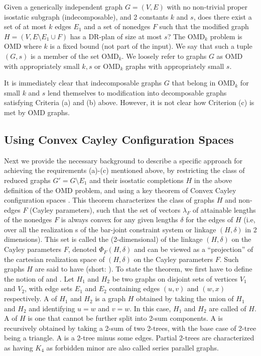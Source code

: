 Given a generically independent graph $G = (V,E)$ with no non-trivial
proper isostatic subgraph (indecomposable), and 2 constants $k$ and
$s$, does there exist a set of at most $k$  edges $E_1$ and a set of
nonedges $F$ such that the modified graph $H = (V, E\setminus E_1 \cup
F)$ has a DR-plan of size at most $s$?  The OMD$_k$ problem is  OMD
where $k$ is a fixed bound (not part of the input).   We say that such
a tuple $(G,s)$ is a member of the set OMD$_k$. We loosely refer to
graphs $G$ as OMD with appropriately small $k,s$ or OMD$_k$ graphs
with appropriately small $s$.


It is immediately clear that indecomposable graphs $G$ that belong in
OMD$_k$ for small $k$ and $s$  lend themselves to modification  into
decomposable graphs satisfying Criteria (a) and (b) above. However, it
is not clear how Criterion (c) is met by OMD graphs.
%
\subsection{Using Convex Cayley Configuration Spaces}
\label{sec:2-tree-reduction}
%
Next we provide the necessary background to describe a specific
approach for achieving the requirements (a)-(c) mentioned above, by
restricting the class of reduced graphs $G' = G\setminus E_1$ and
their isostatic completions $H$ in the above definition of the OMD
problem, and using a key theorem of Convex Cayley configuration spaces
\cite{sitharam2010convex}. This theorem characterizes the class of graphs $H$ and non-
edges $F$ (Cayley parameters), such that the set of vectors
$\lambda_F$ of  attainable lengths of the nonedges $F$ is always
convex for any given lengths $\delta$ for the edges of $H$ (i.e, over
all the realization s of the bar-joint constraint system or linkage
$(H,\delta)$ in 2 dimensions). This set is called the (2-dimensional)
 of the linkage $(H,\delta)$ on the
Cayley parameters $F$, denoted $\Phi_F(H,\delta)$ and can be viewed as
a ``projection'' of the cartesian realization space of $(H,\delta)$ on
the Cayley parameters $F$. Such graphs $H$ are said to have
(short: ). To state the theorem, we first have to
define the notion of  and . Let $H_1$ and
$H_2$ be two graphs on disjoint sets of vertices $V_1$ and $V_2$, with
edge sets $E_1$ and $E_2$ containing edges $(u,v)$ and $(w,x)$
respectively.  A  of $H_1$ and $H_2$ is a graph $H$
obtained by taking the union of $H_1$ and $H_2$ and identifying $u=w$
and $v=w$. In this case, $H_1$ and $H_2$ are called  of $H$. A  of $H$ is  one
that cannot be further split into 2-sum components. A  is
recursively obtained by taking a 2-sum of two 2-trees, with the base
case of 2-tree being a triangle. A  is a 2-tree
minus some edges. Partial 2-trees are characterized as having $K_4$ as
forbidden minor are also called series parallel graphs.

